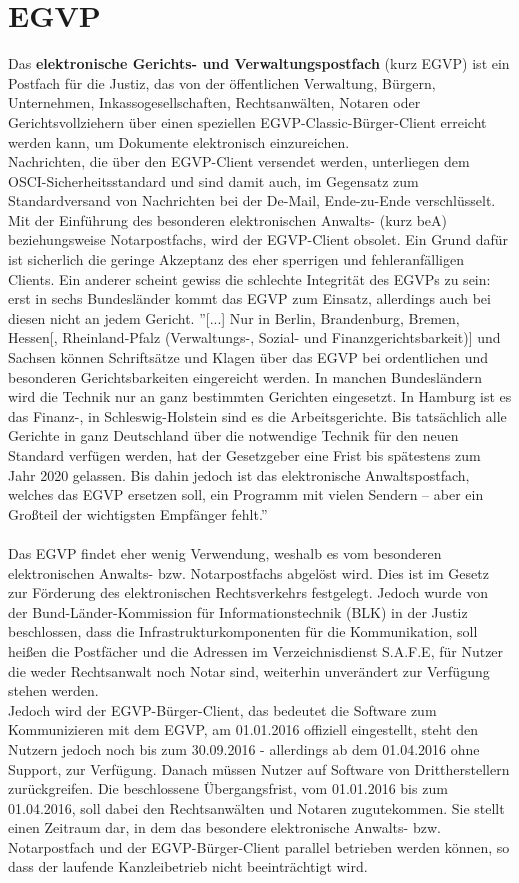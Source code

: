 \section{EGVP}
Das \textbf{elektronische Gerichts- und Verwaltungspostfach} (kurz EGVP) ist ein Postfach für die Justiz, das von der öffentlichen Verwaltung, Bürgern, Unternehmen, Inkassogesellschaften, Rechtsanwälten, Notaren oder Gerichtsvollziehern über einen speziellen EGVP-Classic-Bürger-Client erreicht werden kann, um Dokumente elektronisch einzureichen. \\
Nachrichten, die über den EGVP-Client versendet werden, unterliegen dem OSCI-Sicherheitsstandard und sind damit auch, im Gegensatz zum Standardversand von Nachrichten bei der De-Mail, Ende-zu-Ende verschlüsselt. Mit der Einführung des besonderen elektronischen Anwalts- (kurz beA) beziehungsweise Notarpostfachs, wird der EGVP-Client obsolet. Ein Grund dafür ist sicherlich die geringe Akzeptanz des eher sperrigen und fehleranfälligen Clients. Ein anderer scheint gewiss die schlechte Integrität des EGVPs zu sein: erst in sechs Bundesländer kommt das EGVP zum Einsatz, allerdings auch bei diesen nicht an jedem Gericht. ''[...] Nur in Berlin, Brandenburg, Bremen, Hessen[, Rheinland-Pfalz (Verwaltungs-, Sozial- und Finanzgerichtsbarkeit)] und Sachsen können Schriftsätze und Klagen über das EGVP bei ordentlichen und besonderen Gerichtsbarkeiten eingereicht werden.
In manchen Bundesländern wird die Technik nur an ganz bestimmten Gerichten eingesetzt. In Hamburg ist es das Finanz-, in Schleswig-Holstein sind es die Arbeitsgerichte. Bis tatsächlich alle Gerichte in ganz Deutschland über die notwendige Technik für den neuen Standard verfügen werden, hat der Gesetzgeber eine Frist bis spätestens zum Jahr 2020 gelassen. Bis dahin jedoch ist das elektronische Anwaltspostfach, welches das EGVP ersetzen soll, ein Programm mit vielen Sendern – aber ein Großteil der wichtigsten Empfänger fehlt.'' \cite{bea:egvp:landkarte} \\
\\
Das EGVP findet eher wenig Verwendung, weshalb es vom besonderen elektronischen Anwalts- bzw. Notarpostfachs abgelöst wird. Dies ist im Gesetz zur Förderung des elektronischen Rechtsverkehrs festgelegt. Jedoch wurde von der Bund-Länder-Kommission für Informationstechnik (BLK) in der Justiz beschlossen, dass die Infrastrukturkomponenten für die Kommunikation, soll heißen die Postfächer und die Adressen im Verzeichnisdienst S.A.F.E, für Nutzer die weder Rechtsanwalt noch Notar sind, weiterhin unverändert zur Verfügung stehen werden. \cite{bea:egvp} \\
Jedoch wird der EGVP-Bürger-Client, das bedeutet die Software zum Kommunizieren mit dem EGVP, am 01.01.2016 offiziell eingestellt, steht den Nutzern jedoch noch bis zum 30.09.2016 - allerdings ab dem 01.04.2016 ohne Support, zur Verfügung. Danach müssen Nutzer auf Software von Drittherstellern zurückgreifen. Die beschlossene Übergangsfrist, vom 01.01.2016 bis zum 01.04.2016, soll dabei den Rechtsanwälten und Notaren zugutekommen. Sie stellt einen Zeitraum dar, in dem das besondere elektronische Anwalts- bzw. Notarpostfach und der EGVP-Bürger-Client parallel betrieben werden können, so dass der laufende Kanzleibetrieb nicht beeinträchtigt wird.